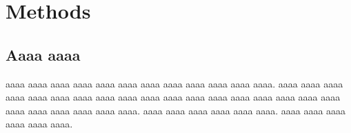 \documentclass[12pt,openany,english]{jsbook}        %
\begin{document}
%
%
%
\chapter{Methods}
%
%
%
\section{Aaaa aaaa}
%
%
%
\begin{doublespace}
%
aaaa aaaa aaaa aaaa aaaa aaaa 
aaaa aaaa aaaa aaaa aaaa aaaa. 
aaaa aaaa aaaa aaaa aaaa aaaa 
aaaa aaaa aaaa aaaa aaaa aaaa 
aaaa aaaa aaaa aaaa aaaa aaaa 
aaaa aaaa aaaa aaaa aaaa aaaa. 
aaaa aaaa aaaa aaaa aaaa aaaa. 
aaaa aaaa aaaa aaaa aaaa aaaa. 
%
\end{doublespace}
%
%
%
\end{document}
